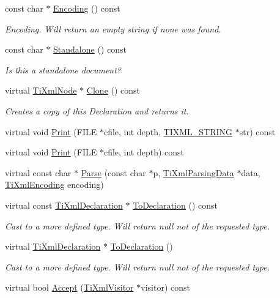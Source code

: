 \begin{DoxyCompactItemize}
const char $\ast$ \hyperlink{class_ti_xml_declaration_a5d974231f9e9a2f0542f15f3a46cdb76}{Encoding} () const 
\begin{DoxyCompactList}\small\item\em Encoding. Will return an empty string if none was found. \end{DoxyCompactList}\item 
const char $\ast$ \hyperlink{class_ti_xml_declaration_a9ff06afc033d7ef730ec7c6825b97ad9}{Standalone} () const 
\begin{DoxyCompactList}\small\item\em Is this a standalone document? \end{DoxyCompactList}\item 
virtual \hyperlink{class_ti_xml_node}{Ti\+Xml\+Node} $\ast$ \hyperlink{class_ti_xml_declaration_aff8231266d735943d8a7514a9c9822b9}{Clone} () const 
\begin{DoxyCompactList}\small\item\em Creates a copy of this Declaration and returns it. \end{DoxyCompactList}\item 
virtual void \hyperlink{class_ti_xml_declaration_aa5ab32ec19d4eeecff4a9238c6c90565}{Print} (F\+I\+L\+E $\ast$cfile, int depth, \hyperlink{tinyxml_8h_a92bada05fd84d9a0c9a5bbe53de26887}{T\+I\+X\+M\+L\+\_\+\+S\+T\+R\+I\+N\+G} $\ast$str) const 
\item 
virtual void \hyperlink{class_ti_xml_declaration_abf6303db4bd05b5be554036817ff1cb4}{Print} (F\+I\+L\+E $\ast$cfile, int depth) const 
\item 
virtual const char $\ast$ \hyperlink{class_ti_xml_declaration_a9839ea97ed687a2b7342fd7b0f04361b}{Parse} (const char $\ast$p, \hyperlink{class_ti_xml_parsing_data}{Ti\+Xml\+Parsing\+Data} $\ast$data, \hyperlink{tinyxml_8h_a88d51847a13ee0f4b4d320d03d2c4d96}{Ti\+Xml\+Encoding} encoding)
\item 
virtual const \hyperlink{class_ti_xml_declaration}{Ti\+Xml\+Declaration} $\ast$ \hyperlink{class_ti_xml_declaration_a1e085d3fefd1dbf5ccdbff729931a967}{To\+Declaration} () const 
\begin{DoxyCompactList}\small\item\em Cast to a more defined type. Will return null not of the requested type. \end{DoxyCompactList}\item 
virtual \hyperlink{class_ti_xml_declaration}{Ti\+Xml\+Declaration} $\ast$ \hyperlink{class_ti_xml_declaration_a6bd3d1daddcaeb9543c24bfd090969ce}{To\+Declaration} ()
\begin{DoxyCompactList}\small\item\em Cast to a more defined type. Will return null not of the requested type. \end{DoxyCompactList}\item 
virtual bool \hyperlink{class_ti_xml_declaration_ab6a6b178161ba9abc2c35058de689864}{Accept} (\hyperlink{class_ti_xml_visitor}{Ti\+Xml\+Visitor} $\ast$visitor) const 
\end{DoxyCompactItemize}
